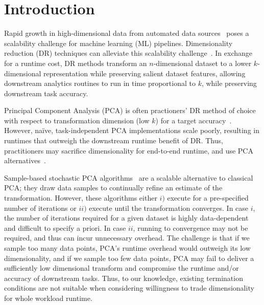 
\section{Introduction}
\label{sec:intro}

Rapid growth in high-dimensional data from automated data sources~\cite{plato,macrobase-cidr} poses a scalability challenge for machine learning (ML) pipelines.
Dimensionality reduction (DR) techniques can alleviate this scalability challenge~\cite{keogh-indexing,local-dr,decade,gemini}.
In exchange for a runtime cost, DR methods transform an $n$-dimensional dataset to a lower $k$-dimensional representation while preserving salient dataset features, allowing downstream analytics routines to run in time proportional to $k$, while preserving downstream task accuracy.

Principal Component Analysis (PCA) is often practioners' DR method of choice with respect to transformation dimension (low $k$) for a target accuracy~\cite{jolbook}. 
However, na\"{i}ve, task-independent PCA implementations scale poorly, resulting in runtimes that outweigh the downstream runtime benefit of DR. 
Thus, practitioners may sacrifice dimensionality for end-to-end runtime, and use PCA alternatives~\cite{keogh-study}. 

Sample-based stochastic PCA algorithms~\cite{shamir,re-new} are a scalable alternative to classical PCA; they draw data samples to continually refine an estimate of the transformation. 
However, these algorithms either $i)$ execute for a pre-specified number of iterations or $ii)$ execute until the transformation converges.
In case $i$, the number of iterations required for a given dataset is highly data-dependent and difficult to specify a priori.
In case $ii$, running to convergence may not be required, and thus can incur unnecessary overhead.
The challenge is that if we sample too many data points, PCA's runtime overhead would outweigh its low dimensionality, and if we sample too few data points, PCA may fail to deliver a sufficiently low dimensional transform and compromise the runtime and/or accuracy of downstream tasks.
Thus, to our knowledge, existing termination conditions are not suitable when considering willingness to trade dimensionality for whole workload runtime.


